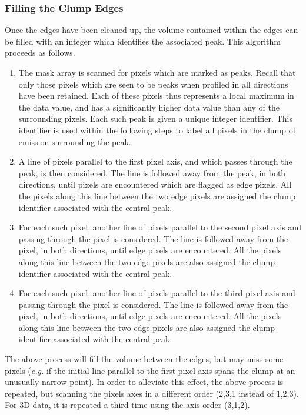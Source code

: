\documentclass[twoside,11pt]{article}
\renewcommand{\_}{\texttt{\symbol{95}}}
\begin{document}
\subsubsection{Filling the Clump Edges}
Once the edges have been cleaned up, the volume contained within the
edges can be filled with an integer which identifies the associated peak.
This algorithm proceeds as follows.

\begin{enumerate}

\item The mask array is scanned for pixels which are marked as peaks.
Recall that only those pixels which are seen to be peaks when profiled
in all directions have been retained. Each of these pixels thus represents
a local maximum in the data value, and has a significantly higher data
value than any of the surrounding pixels. Each such peak is given a
unique integer identifier. This identifier is used within the following
steps to label all pixels in the clump of emission surrounding the peak.

\item A line of pixels parallel to the first pixel axis, and which passes
through the peak, is then considered. The line is followed away from the
peak, in both directions, until pixels are encountered which are flagged as
edge pixels. All the pixels along this line between the two edge pixels
are assigned the clump identifier associated with the central peak.

\item For each such pixel, another line of pixels parallel to the second
pixel axis and passing through the pixel is considered. The line is followed
away from the pixel, in both directions, until edge pixels are encountered.
All the pixels along this line between the two edge pixels are also assigned
the clump identifier associated with the central peak.

\item For each such pixel, another line of pixels parallel to the third
pixel axis and passing through the pixel is considered. The line is followed
away from the pixel, in both directions, until edge pixels are encountered.
All the pixels along this line between the two edge pixels are also assigned
the clump identifier associated with the central peak.

\end{enumerate}

The above process will fill the volume between the edges, but may miss
some pixels (\emph{e.g.} if the initial line parallel to the first pixel
axis spans the clump at an unusually narrow point). In order to alleviate
this effect, the above process is repeated, but scanning the pixels axes
in a different order (2,3,1 instead of 1,2,3). For 3D data, it is repeated
a third time using the axis order (3,1,2).
\end{document}
